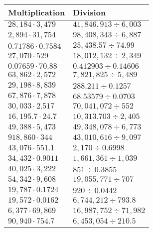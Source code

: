 \begin{longtable}[]{@{}ll@{}}
\toprule
Multiplication & Division\tabularnewline
\midrule
\endhead
\(28,184\cdot3,479\) & \(41,846,913÷6,003\)\tabularnewline
\(2,894\cdot31,754\) & \(98,408,343÷6,887\)\tabularnewline
\(0.71786\cdot0.7584\) & \(25,438.57÷74.99\)\tabularnewline
\(27,070\cdot529\) & \(18,012,132÷2,349\)\tabularnewline
\(0.07659\cdot70.88\) & \(0.412903÷0.14606\)\tabularnewline
\(63,862\cdot2,572\) & \(7,821,825÷5,489\)\tabularnewline
\(29,198\cdot8,839\) & \(288.211÷0.1257\)\tabularnewline
\(67,876\cdot7,878\) & \(68.53579÷0.0703\)\tabularnewline
\(30,033\cdot2.517\) & \(70,041,072÷552\)\tabularnewline
\(16,195.7\cdot 24.7\) & \(10,313.703÷2,405\)\tabularnewline
\(49,388\cdot 5,473\) & \(49,348,078÷6,773\)\tabularnewline
\(918,860\cdot344\) & \(43,010,616÷9,097\)\tabularnewline
\(43,076\cdot551.1\) & \(2,170÷0.6998\)\tabularnewline
\(34,432\cdot0.9011\) & \(1,661,361÷1,039\)\tabularnewline
\(40,025\cdot3,222\) & \(851÷0.3855\)\tabularnewline
\(54,342\cdot9,608\) & \(19,055,771÷707\)\tabularnewline
\(19,787\cdot0.1724\) & \(920÷0.0442\)\tabularnewline
\(19,572\cdot0.0162\) & \(6,744,212÷793.8\)\tabularnewline
\(6,377\cdot69,869\) & \(16,987,752÷71,982\)\tabularnewline
\(90,940\cdot754.7\) & \(6,453,054÷210.5\)\tabularnewline
\bottomrule
\end{longtable}
